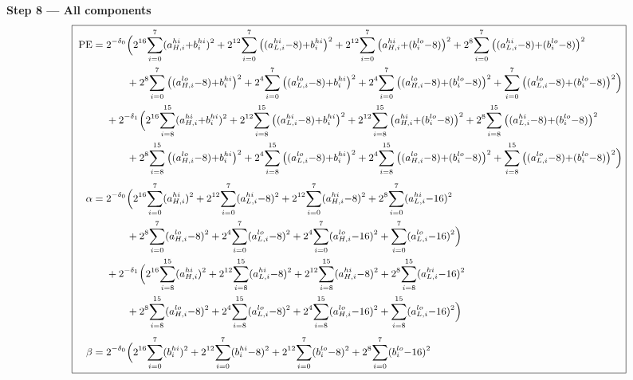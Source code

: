 \documentclass[fleqn]{article}
\begin{document}
\textbf{Step 8 --- All components}
{\setlength{\mathindent}{0em}
\[
\small
\boxed{\;
\begin{aligned}
\mathrm{PE} ={}& 2^{-\delta_0}\Big(2^{16}\!\sum_{i=0}^{7}(a_{H,i}^{hi}{+}b_i^{hi})^2 + 2^{12}\!\sum_{i=0}^{7}\big((a_{L,i}^{hi}{-}8){+}b_i^{hi}\big)^2 + 2^{12}\!\sum_{i=0}^{7}\big(a_{H,i}^{hi}{+}(b_i^{lo}{-}8)\big)^2 + 2^{8}\!\sum_{i=0}^{7}\big((a_{L,i}^{hi}{-}8){+}(b_i^{lo}{-}8)\big)^2 \\
  & \qquad + 2^{8}\!\sum_{i=0}^{7}\big((a_{H,i}^{lo}{-}8){+}b_i^{hi}\big)^2 + 2^{4}\!\sum_{i=0}^{7}\big((a_{L,i}^{lo}{-}8){+}b_i^{hi}\big)^2 + 2^{4}\!\sum_{i=0}^{7}\big((a_{H,i}^{lo}{-}8){+}(b_i^{lo}{-}8)\big)^2 + \sum_{i=0}^{7}\big((a_{L,i}^{lo}{-}8){+}(b_i^{lo}{-}8)\big)^2\Big) \\
  & + 2^{-\delta_1}\Big(2^{16}\!\sum_{i=8}^{15}(a_{H,i}^{hi}{+}b_i^{hi})^2 + 2^{12}\!\sum_{i=8}^{15}\big((a_{L,i}^{hi}{-}8){+}b_i^{hi}\big)^2 + 2^{12}\!\sum_{i=8}^{15}\big(a_{H,i}^{hi}{+}(b_i^{lo}{-}8)\big)^2 + 2^{8}\!\sum_{i=8}^{15}\big((a_{L,i}^{hi}{-}8){+}(b_i^{lo}{-}8)\big)^2 \\
  & \qquad + 2^{8}\!\sum_{i=8}^{15}\big((a_{H,i}^{lo}{-}8){+}b_i^{hi}\big)^2 + 2^{4}\!\sum_{i=8}^{15}\big((a_{L,i}^{lo}{-}8){+}b_i^{hi}\big)^2 + 2^{4}\!\sum_{i=8}^{15}\big((a_{H,i}^{lo}{-}8){+}(b_i^{lo}{-}8)\big)^2 + \sum_{i=8}^{15}\big((a_{L,i}^{lo}{-}8){+}(b_i^{lo}{-}8)\big)^2\Big) \\[0.3em]
\alpha ={}& 2^{-\delta_0}\Big(2^{16}\!\sum_{i=0}^{7}(a_{H,i}^{hi})^2 + 2^{12}\!\sum_{i=0}^{7}(a_{L,i}^{hi}{-}8)^2 + 2^{12}\!\sum_{i=0}^{7}(a_{H,i}^{hi}{-}8)^2 + 2^{8}\!\sum_{i=0}^{7}(a_{L,i}^{hi}{-}16)^2 \\
  & \qquad + 2^{8}\!\sum_{i=0}^{7}(a_{H,i}^{lo}{-}8)^2 + 2^{4}\!\sum_{i=0}^{7}(a_{L,i}^{lo}{-}8)^2 + 2^{4}\!\sum_{i=0}^{7}(a_{H,i}^{lo}{-}16)^2 + \sum_{i=0}^{7}(a_{L,i}^{lo}{-}16)^2\Big) \\
  & + 2^{-\delta_1}\Big(2^{16}\!\sum_{i=8}^{15}(a_{H,i}^{hi})^2 + 2^{12}\!\sum_{i=8}^{15}(a_{L,i}^{hi}{-}8)^2 + 2^{12}\!\sum_{i=8}^{15}(a_{H,i}^{hi}{-}8)^2 + 2^{8}\!\sum_{i=8}^{15}(a_{L,i}^{hi}{-}16)^2 \\
  & \qquad + 2^{8}\!\sum_{i=8}^{15}(a_{H,i}^{lo}{-}8)^2 + 2^{4}\!\sum_{i=8}^{15}(a_{L,i}^{lo}{-}8)^2 + 2^{4}\!\sum_{i=8}^{15}(a_{H,i}^{lo}{-}16)^2 + \sum_{i=8}^{15}(a_{L,i}^{lo}{-}16)^2\Big) \\[0.3em]
\beta ={}& 2^{-\delta_0}\Big(2^{16}\!\sum_{i=0}^{7}(b_i^{hi})^2 + 2^{12}\!\sum_{i=0}^{7}(b_i^{hi}{-}8)^2 + 2^{12}\!\sum_{i=0}^{7}(b_i^{lo}{-}8)^2 + 2^{8}\!\sum_{i=0}^{7}(b_i^{lo}{-}16)^2 \\

\end{aligned}}\]}
\end{document}
